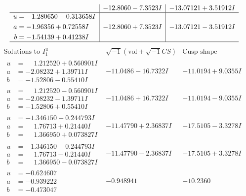 \documentclass[1p]{elsarticle_modified}
\theoremstyle{definition}
\newcommand{\I}{\sqrt{-1}}
\begin{document}
$$\begin{array}{c|c|c}
 & -12.8060 - 7.3523 I & -13.07121 + 3.51912 I \\ \hline\begin{aligned}
u &= -1.280650 - 0.313658 I \\
a &= -1.96356 + 0.72558 I \\
b &= -1.54139 + 0.41238 I\end{aligned}
 & -12.8060 + 7.3523 I & -13.07121 - 3.51912 I\\
 \hline 
 \end{array}$$\newpage$$\begin{array}{c|c|c}  
\text{Solutions to }I^u_{1}& \I (\text{vol} + \sqrt{-1}CS) & \text{Cusp shape}\\
 \hline 
\begin{aligned}
u &= \phantom{-}1.212520 + 0.560901 I \\
a &= -2.08232 + 1.39711 I \\
b &= -1.52806 - 0.55410 I\end{aligned}
 & -11.0486 - 16.7322 I & -11.0194 + 9.0355 I \\ \hline\begin{aligned}
u &= \phantom{-}1.212520 - 0.560901 I \\
a &= -2.08232 - 1.39711 I \\
b &= -1.52806 + 0.55410 I\end{aligned}
 & -11.0486 + 16.7322 I & -11.0194 - 9.0355 I \\ \hline\begin{aligned}
u &= -1.346150 + 0.244793 I \\
a &= \phantom{-}1.76713 + 0.21440 I \\
b &= \phantom{-}1.366950 + 0.073827 I\end{aligned}
 & -11.47790 + 2.36837 I & -17.5105 - 3.3278 I \\ \hline\begin{aligned}
u &= -1.346150 - 0.244793 I \\
a &= \phantom{-}1.76713 - 0.21440 I \\
b &= \phantom{-}1.366950 - 0.073827 I\end{aligned}
 & -11.47790 - 2.36837 I & -17.5105 + 3.3278 I \\ \hline\begin{aligned}
u &= -0.624607\phantom{ +0.000000I} \\
a &= -0.939222\phantom{ +0.000000I} \\
b &= -0.473047\phantom{ +0.000000I}\end{aligned}
 & -0.948941\phantom{ +0.000000I} & -10.2360\phantom{ +0.000000I} \\ \hline\begin{aligned}

\end{aligned}
\end{array}$$
\end{document}
